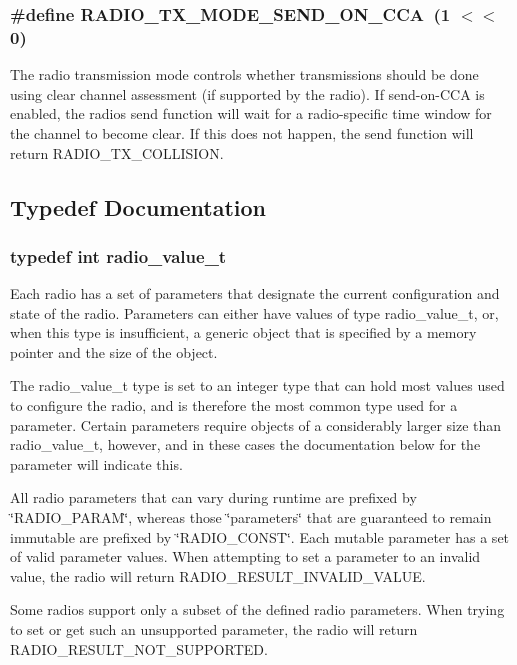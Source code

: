 \subsubsection[{R\+A\+D\+I\+O\+\_\+\+T\+X\+\_\+\+M\+O\+D\+E\+\_\+\+S\+E\+N\+D\+\_\+\+O\+N\+\_\+\+C\+C\+A}]{\setlength{\rightskip}{0pt plus 5cm}\#define R\+A\+D\+I\+O\+\_\+\+T\+X\+\_\+\+M\+O\+D\+E\+\_\+\+S\+E\+N\+D\+\_\+\+O\+N\+\_\+\+C\+C\+A~(1 $<$$<$ 0)}\label{group__radio_ga5f5b62a16d559e006cc34139fc59393b}
The radio transmission mode controls whether transmissions should be done using clear channel assessment (if supported by the radio). If send-\/on-\/\+C\+C\+A is enabled, the radio\textquotesingle{}s send function will wait for a radio-\/specific time window for the channel to become clear. If this does not happen, the send function will return R\+A\+D\+I\+O\+\_\+\+T\+X\+\_\+\+C\+O\+L\+L\+I\+S\+I\+O\+N. 

\subsection{Typedef Documentation}
\hypertarget{group__radio_gad8766f1c2c2c55ac53079fe58750967a}{}
\subsubsection[{radio\+\_\+value\+\_\+t}]{\setlength{\rightskip}{0pt plus 5cm}typedef int {\bf radio\+\_\+value\+\_\+t}}\label{group__radio_gad8766f1c2c2c55ac53079fe58750967a}
Each radio has a set of parameters that designate the current configuration and state of the radio. Parameters can either have values of type radio\+\_\+value\+\_\+t, or, when this type is insufficient, a generic object that is specified by a memory pointer and the size of the object.

The radio\+\_\+value\+\_\+t type is set to an integer type that can hold most values used to configure the radio, and is therefore the most common type used for a parameter. Certain parameters require objects of a considerably larger size than radio\+\_\+value\+\_\+t, however, and in these cases the documentation below for the parameter will indicate this.

All radio parameters that can vary during runtime are prefixed by \char`\"{}\+R\+A\+D\+I\+O\+\_\+\+P\+A\+R\+A\+M\char`\"{}, whereas those \char`\"{}parameters\char`\"{} that are guaranteed to remain immutable are prefixed by \char`\"{}\+R\+A\+D\+I\+O\+\_\+\+C\+O\+N\+S\+T\char`\"{}. Each mutable parameter has a set of valid parameter values. When attempting to set a parameter to an invalid value, the radio will return R\+A\+D\+I\+O\+\_\+\+R\+E\+S\+U\+L\+T\+\_\+\+I\+N\+V\+A\+L\+I\+D\+\_\+\+V\+A\+L\+U\+E.

Some radios support only a subset of the defined radio parameters. When trying to set or get such an unsupported parameter, the radio will return R\+A\+D\+I\+O\+\_\+\+R\+E\+S\+U\+L\+T\+\_\+\+N\+O\+T\+\_\+\+S\+U\+P\+P\+O\+R\+T\+E\+D. 